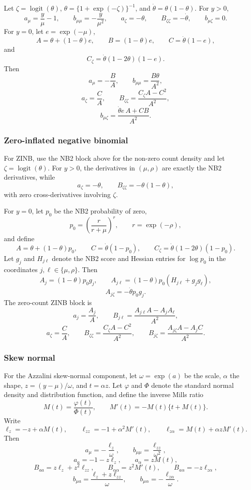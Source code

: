 \documentclass{article}
\DeclareMathOperator{\logit}{logit}
\begin{document}
Let $\zeta=\logit(\theta)$, $\theta=\{1+\exp(-\zeta)\}^{-1}$, and
$\dot\theta=\theta(1-\theta)$.  For $y>0$,
\[
    a_\mu=\frac{y}{\mu}-1,\qquad
    b_{\mu\mu}=-\frac{y}{\mu^2},\qquad
    a_\zeta=-\theta,\qquad
    B_{\zeta\zeta}=-\dot\theta,\qquad
    b_{\mu\zeta}=0 .
\]
For $y=0$, let $e=\exp(-\mu)$,
\[
    A=\theta+(1-\theta)e,\qquad
    B=(1-\theta)e,\qquad
    C=\dot\theta(1-e),
\]
and
\[
    C_\zeta=\dot\theta(1-2\theta)(1-e).
\]
Then
\[
    a_\mu=-\frac{B}{A},\qquad
    b_{\mu\mu}=\frac{B\theta}{A^2},
\]
\[
    a_\zeta=\frac{C}{A},\qquad
    B_{\zeta\zeta}=\frac{C_\zeta A-C^2}{A^2},
\]
\[
    b_{\mu\zeta}
    =
    \frac{\dot\theta e\,A+CB}{A^2}.
\]

\subsubsection*{Zero-inflated negative binomial}

For ZINB, use the NB2 block above for the non-zero count density and let
$\zeta=\logit(\theta)$.  For $y>0$, the derivatives in $(\mu,\rho)$ are exactly
the NB2 derivatives, while
\[
    a_\zeta=-\theta,\qquad B_{\zeta\zeta}=-\theta(1-\theta),
\]
with zero cross-derivatives involving $\zeta$.

For $y=0$, let $p_0$ be the NB2 probability of zero,
\[
    p_0=\left(\frac{r}{r+\mu}\right)^r,\qquad r=\exp(-\rho),
\]
and define
\[
    A=\theta+(1-\theta)p_0,\qquad
    C=\dot\theta(1-p_0),\qquad
    C_\zeta=\dot\theta(1-2\theta)(1-p_0).
\]
Let $g_j$ and $H_{j\ell}$ denote the NB2 score and Hessian entries for
$\log p_0$ in the coordinates $j,\ell\in\{\mu,\rho\}$.  Then
\[
    A_j=(1-\theta)p_0g_j,\qquad
    A_{j\ell}=(1-\theta)p_0(H_{j\ell}+g_jg_\ell),
\]
\[
    A_{j\zeta}=-\dot\theta p_0 g_j.
\]
The zero-count ZINB block is
\[
    a_j=\frac{A_j}{A},\qquad
    B_{j\ell}=\frac{A_{j\ell}A-A_jA_\ell}{A^2},
\]
\[
    a_\zeta=\frac{C}{A},\qquad
    B_{\zeta\zeta}=\frac{C_\zeta A-C^2}{A^2},
\qquad
    B_{j\zeta}=\frac{A_{j\zeta}A-A_jC}{A^2}.
\]

\subsubsection*{Skew normal}

For the Azzalini skew-normal component, let $\omega=\exp(a)$ be the scale,
$\alpha$ the shape, $z=(y-\mu)/\omega$, and $t=\alpha z$.  Let
$\varphi$ and $\Phi$ denote the standard normal density and distribution
function, and define the inverse Mills ratio
\[
    M(t)=\frac{\varphi(t)}{\Phi(t)},\qquad
    M'(t)=-M(t)\{t+M(t)\}.
\]
Write
\[
    \ell_z=-z+\alpha M(t),\qquad
    \ell_{zz}=-1+\alpha^2M'(t),\qquad
    \ell_{z\alpha}=M(t)+\alpha z M'(t).
\]
Then
\[
    a_\mu=-\frac{\ell_z}{\omega},\qquad
    b_{\mu\mu}=\frac{\ell_{zz}}{\omega^2},
\]
\[
    a_a=-1-z\ell_z,\qquad
    a_\alpha=zM(t),
\]
\[
    B_{aa}=z\ell_z+z^2\ell_{zz},\qquad
    B_{\alpha\alpha}=z^2M'(t),\qquad
    B_{a\alpha}=-z\ell_{z\alpha},
\]
\[
    b_{\mu a}=\frac{\ell_z+z\ell_{zz}}{\omega},\qquad
    b_{\mu\alpha}=-\frac{\ell_{z\alpha}}{\omega}.
\]
\end{document}
